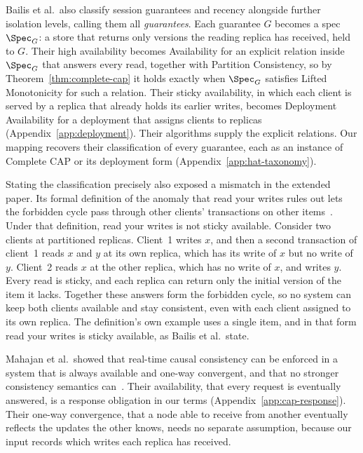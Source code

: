 Bailis et al.\ also classify session guarantees and recency alongside further
isolation levels, calling them all \emph{guarantees}.  Each guarantee $G$
becomes a spec $\Spec_G$: a store that returns only versions the reading
replica has received, held to $G$.  Their high availability becomes
Availability for an explicit relation inside $\Spec_G$ that answers every read,
together with Partition Consistency, so by Theorem~\ref{thm:complete-cap} it
holds exactly when $\Spec_G$ satisfies Lifted Monotonicity for such a relation.
Their sticky availability, in which each client is served by a replica that
already holds its earlier writes, becomes Deployment Availability for a
deployment that assigns clients to replicas
(Appendix~\ref{app:deployment}).  Their algorithms supply the
explicit relations.  Our mapping recovers their classification of every
guarantee, each as an instance of Complete CAP or its deployment form
(Appendix~\ref{app:hat-taxonomy}).

Stating the classification precisely also exposed a mismatch in the extended
paper.  Its formal definition of the anomaly that read your writes rules out
lets the forbidden cycle pass through other clients' transactions on other
items~\cite[Def.~34]{bailis2013hatextended}.  Under that definition, read your
writes is not sticky available.  Consider two clients at partitioned replicas.
Client~1 writes $x$, and then a second transaction of client~1 reads $x$ and
$y$ at its own replica, which has its write of $x$ but no write of $y$.
Client~2 reads $x$ at the other replica, which has no write of $x$, and writes
$y$.  Every read is sticky, and each replica can return only the initial
version of the item it lacks.  Together these answers form the forbidden
cycle, so no system can keep both clients available and stay consistent, even
with each client assigned to its own replica.  The definition's own example
uses a single item, and in that form read your writes is sticky available, as
Bailis et al.\ state.

Mahajan et al.\ showed that real-time causal consistency can be enforced in a
system that is always available and one-way convergent, and that no stronger
consistency semantics can~\cite{mahajan2011consistency}.  Their availability,
that every request is eventually answered, is a response obligation in our
terms (Appendix~\ref{app:cap-response}).  Their one-way convergence, that a
node able to receive from another eventually reflects the updates the other
knows, needs no separate assumption, because our input records which writes
each replica has received.

